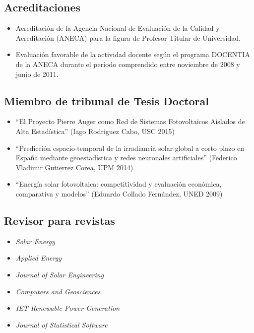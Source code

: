 \documentclass[article, a4paper]{memoir}
\begin{document}
\subsection{Acreditaciones}
\label{sec:orgheadline83}

\begin{itemize}
\item Acreditación de la Agencia Nacional de Evaluación de la Calidad y Acreditación (ANECA) para la figura de Profesor Titular de Universidad.

\item Evaluación favorable de la actividad docente según el programa DOCENTIA de la ANECA durante el período comprendido entre noviembre de 2008 y junio de 2011.
\end{itemize}

\subsection{Miembro de tribunal de Tesis Doctoral}
\label{sec:orgheadline84}

\begin{itemize}
\item ``El Proyecto Pierre Auger como Red de Sistemas Fotovoltaicos Aislados de Alta Estadística'' (Iago Rodriguez Cabo, USC 2015)

\item ``Predicción espacio-temporal de la irradiancia solar global a corto plazo en España mediante geoestadística y redes neuronales artificiales'' (Federico Vladimir Gutierrez Corea, UPM 2014)

\item ``Energía solar fotovoltaica: competitividad y evaluación económica, comparativa y modelos'' (Eduardo Collado Fernández, UNED 2009)
\end{itemize}

\subsection{Revisor para revistas}
\label{sec:orgheadline85}

\begin{itemize}
\item \emph{Solar Energy}

\item \emph{Applied Energy}

\item \emph{Journal of Solar Engineering}

\item \emph{Computers and Geosciences}

\item \emph{IET Renewable Power Generation}

\item \emph{Journal of Statistical Software}
\end{itemize}
\end{document}
